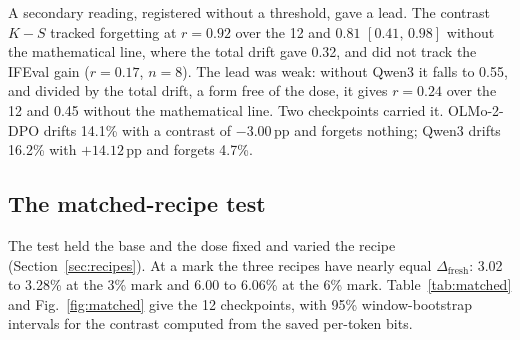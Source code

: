 \documentclass[11pt,a4paper]{article}
\theoremstyle{definition}
\newcommand{\dfresh}{\Delta_{\mathrm{fresh}}}
\newcommand{\KS}{$K\!-\!S$}
\newcommand{\pp}{\,pp}
\begin{document}
A secondary reading, registered without a threshold, gave a lead. The contrast \KS{} tracked forgetting at
$r=0.92$ over the 12 and $0.81$ $[0.41,\,0.98]$ without the mathematical line, where the total drift gave 0.32, and
did not track the IFEval gain ($r=0.17$, $n=8$). The lead was weak: without Qwen3 it falls to 0.55, and divided by
the total drift, a form free of the dose, it gives $r=0.24$ over the 12 and 0.45 without the mathematical line. Two
checkpoints carried it. OLMo-2-DPO drifts 14.1\% with a contrast of $-3.00$\pp{} and forgets nothing; Qwen3 drifts
16.2\% with $+14.12$\pp{} and forgets 4.7\%.

\subsection{The matched-recipe test}
\label{sec:matched}

The test held the base and the dose fixed and varied the recipe (Section~\ref{sec:recipes}). At a mark the three
recipes have nearly equal $\dfresh$: 3.02 to 3.28\% at the 3\% mark and 6.00 to 6.06\% at the 6\% mark.
Table~\ref{tab:matched} and Fig.~\ref{fig:matched} give the 12 checkpoints, with 95\% window-bootstrap intervals
for the contrast computed from the saved per-token bits.
\end{document}
